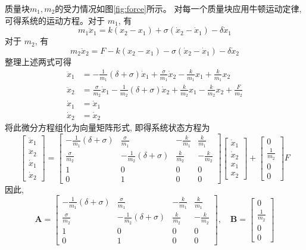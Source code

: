 \documentclass[UTF8]{ctexart}
\begin{document}
  质量块$m_1,m_2$的受力情况如图\ref{fig:force}所示。
  对每一个质量块应用牛顿运动定律, 可得系统的运动方程。对于 $m_{1}$, 有
  $$
  m_{1} \ddot{x}_{1}=k\left(x_{2}-x_{1}\right)+\sigma\left(\dot{x}_{2}-\dot{x}_{1}\right)-\delta \dot{x}_{1}
  $$
  对于 $m_{2}$, 有
  $$
  m_{2} \ddot{x}_{2}=F-k\left(x_{2}-x_{1}\right)-\sigma\left(\dot{x}_{2}-\dot{x}_{1}\right)-\delta \dot{x}_{2}
  $$
  整理上述两式可得
  $$
  \begin{aligned}
  \ddot{x}_{1} &=-\frac{1}{m_{1}}(\delta+\sigma) \dot{x}_{1}+\frac{\sigma}{m_{1}} \dot{x}_{2}-\frac{k}{m_{1}} x_{1}+\frac{k}{m_{1}} x_{2} \\
  \ddot{x}_{2} &=\frac{\sigma}{m_{2}} \dot{x}_{1}-\frac{1}{m_{2}}(\delta+\sigma) \dot{x}_{2}+\frac{k}{m_{2}} x_{1}-\frac{k}{m_{2}} x_{2}+\frac{F}{m_{2}} \\
  \dot{x}_{1} &=\dot{x}_{1} \\
  \dot{x}_{2} &=\dot{x}_{2}
  \end{aligned}
  $$
  将此微分方程组化为向量矩阵形式, 即得系统状态方程为
$$
\left[\begin{array}{c}
\ddot{x}_{1} \\
\ddot{x}_{2} \\
\dot{x}_{1} \\
\dot{x}_{2}
\end{array}\right]=\left[\begin{array}{cccc}
-\frac{1}{m_{1}}(\delta+\sigma) & \frac{\sigma}{m_{1}} & -\frac{k}{m_{1}} & \frac{k}{m_{1}} \\
\frac{\sigma}{m_{2}} & -\frac{1}{m_{2}}(\delta+\sigma) & \frac{k}{m_{2}} & -\frac{k}{m_{2}} \\
1 & 0 & 0 & 0 \\
0 & 1 & 0 & 0
\end{array}\right]\left[\begin{array}{c}
\dot{x}_{1} \\
\dot{x}_{2} \\
x_{1} \\
x_{2}
\end{array}\right]+\left[\begin{array}{c}
0 \\
\frac{1}{m_{2}} \\
0 \\
0
\end{array}\right] F
$$
因此,
$$
\boldsymbol{A}=\left[\begin{array}{cccc}
-\frac{1}{m_{1}}(\delta+\sigma) & \frac{\sigma}{m_{1}} & -\frac{k}{m_{1}} & \frac{k}{m_{1}} \\
\frac{\sigma}{m_{2}} & -\frac{1}{m_{2}}(\delta+\sigma) & \frac{k}{m_{2}} & -\frac{k}{m_{2}} \\
1 & 0 & 0 & 0 \\
0 & 1 & 0 & 0
\end{array}\right], \quad \boldsymbol{B}=\left[\begin{array}{c}
0 \\
\frac{1}{m_{2}} \\
0 \\
0
\end{array}\right]
$$
\end{document}
